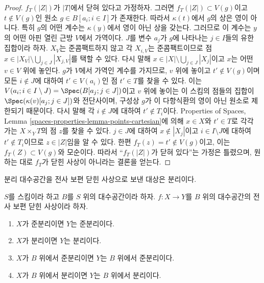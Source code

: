 \begin{proof}
\medskip\noindent
$f_T(|Z|)$가 $|T|$에서 닫혀 있다고 가정하자.
그러면 $f_T(|Z|) \subset V(g)$이고 $t \not \in V(g)$인 원소
$g \in B[a_i; i \in I]$가 존재한다. 따라서 $\kappa(t)$에서 $g$의
상은 영이 아니다. 특히 $g$의 어떤 계수는 $\kappa(y)$에서 영이 아닌
상을 갖는다. 그러므로 이 계수는 $y$의 어떤 아핀 열린 근방 $V$에서
가역이다. $J$를 변수 $a_j$가 $g$에 나타나는 $j \in I$들의 유한
집합이라 하자. $X_V$는 준콤팩트하지 않고 각 $X_{i, V}$는
준콤팩트이므로 점
$x \in |X_V| \setminus \bigcup_{j \in J} |X_{j, V}|$를 택할 수 있다.
다시 말해 $x \in |X| \setminus \bigcup_{j \in J} |X_j|$이고
$x$는 어떤 $v \in V$ 위에 놓인다. $g$가 $V$에서 가역인 계수를
가지므로, $v$ 위에 놓이고 $t' \not \in V(g)$이며 모든
$i \notin J$에 대하여 $t' \in V(a_i)$인 점 $t' \in T$를 찾을 수 있다.
이는
$V(a_i; i \in I \setminus J) = \Spec(B[a_j; j\in J])$이고
$v$ 위에 놓이는 이 스킴의 점들의 집합이
$\Spec(\kappa(v)[a_j; j \in J])$와 전단사이며, 구성상 $g$가
이 다항식환의 영이 아닌 원소로 제한되기 때문이다.
다시 말해 각 $i \not \in J$에 대하여 $t' \not \in T_i$이다.
Properties of Spaces, Lemma
\ref{spaces-properties-lemma-points-cartesian}에 의해
$x \in X$와 $t' \in T$로 각각 가는 $X \times_Y T$의 점 $z$를
찾을 수 있다. $j \in J$에 대하여 $x \not \in |X_j|$이고
$i \in I \setminus J$에 대하여 $t' \not \in T_i$이므로
$z \in |Z|$임을 알 수 있다. 한편
$f_T(z) = t' \not \in V(g)$이고, 이는 $f_T(Z) \subset V(g)$와
모순이다. 따라서 “$f_T(|Z|)$가 닫혀 있다”는 가정은 틀렸으며,
원하는 대로 $f_T$가 닫힌 사상이 아니라는 결론을 얻는다.
\end{proof}

\noindent
분리 대수공간을 전사 보편 닫힌 사상으로 보낸 대상은 분리이다.

\begin{lemma}
\label{lemma-image-universally-closed-separated}
$S$를 스킴이라 하고 $B$를 $S$ 위의 대수공간이라 하자.
$f : X \to Y$를 $B$ 위의 대수공간의 전사 보편 닫힌 사상이라 하자.
\begin{enumerate}
\item $X$가 준분리이면 $Y$는 준분리이다.
\item $X$가 분리이면 $Y$는 분리이다.
\item $X$가 $B$ 위에서 준분리이면 $Y$는 $B$ 위에서 준분리이다.
\item $X$가 $B$ 위에서 분리이면 $Y$는 $B$ 위에서 분리이다.
\end{enumerate}
\end{lemma}

